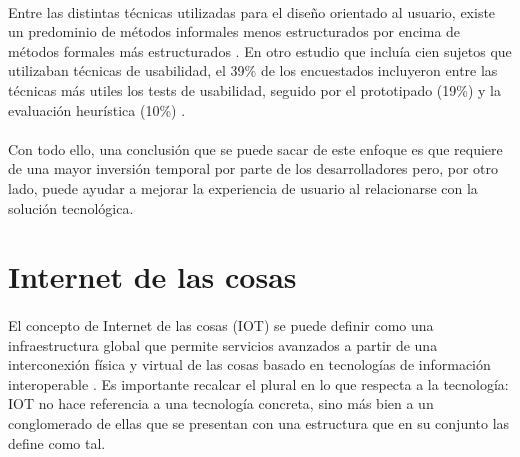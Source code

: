 \paragraph{}
Entre las distintas técnicas utilizadas para el diseño orientado al usuario, existe un predominio de métodos informales menos estructurados por encima de métodos formales más estructurados \citep{hudson2000user}. En otro estudio que incluía cien sujetos que utilizaban técnicas de usabilidad, el 39\% de los encuestados incluyeron entre las técnicas más utiles los tests de usabilidad, seguido por el prototipado (19\%) y la evaluación heurística (10\%) \citep{gunther2001ucd}.

\paragraph{}
Con todo ello, una conclusión que se puede sacar de este enfoque es que requiere de una mayor inversión temporal por parte de los desarrolladores pero, por otro lado, puede ayudar a mejorar la experiencia de usuario al relacionarse con la solución tecnológica.

\section{Internet de las cosas}
\label{sec:iot}
\paragraph{}
El concepto de Internet de las cosas (IOT) se puede definir como una infraestructura global que permite servicios avanzados a partir de una interconexión física y virtual de las cosas basado en tecnologías de información interoperable \citep{itu2012new}. Es importante recalcar el plural en lo que respecta a la tecnología: IOT no hace referencia a una tecnología concreta, sino más bien a un conglomerado de ellas que se presentan con una estructura que en su conjunto las define como tal.

